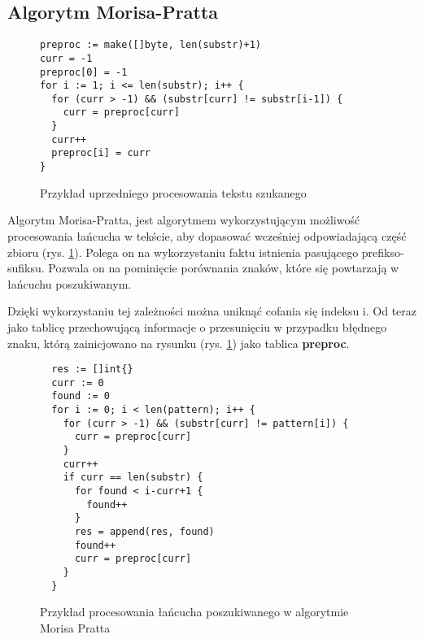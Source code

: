 
\subsection{Algorytm Morisa-Pratta}

\begin{figure}[htbp]
  \centering
  \begin{lstlisting}
preproc := make([]byte, len(substr)+1)
curr = -1
preproc[0] = -1
for i := 1; i <= len(substr); i++ {
  for (curr > -1) && (substr[curr] != substr[i-1]) {
    curr = preproc[curr]
  }
  curr++
  preproc[i] = curr
}
  \end{lstlisting}
  \caption{Przykład uprzedniego procesowania tekstu szukanego}
  \label{fig:code:preprocessMorisPratt}
\end{figure}

Algorytm Morisa-Pratta, jest algorytmem wykorzystującym możliwość procesowania 
łańcucha w tekście, aby dopasować wcześniej odpowiadającą część zbioru
(rys. \ref{fig:code:preprocessMorisPratt}). Polega on na wykorzystaniu faktu
 istnienia pasującego prefikso-sufiksu. Pozwala on na pominięcie porównania
 znaków, które się powtarzają w łańcuchu poszukiwanym.

Dzięki wykorzystaniu tej zależności można uniknąć cofania się indeksu i. 
Od teraz jako tablicę przechowującą informacje o przesunięciu w przypadku 
błędnego znaku, którą zainicjowano na rysunku (rys. \ref{fig:code:preprocessMorisPratt})
jako tablica \textbf{preproc}.

\begin{figure}[htbp]
    \centering
    \begin{lstlisting}
  res := []int{}
  curr := 0
  found := 0
  for i := 0; i < len(pattern); i++ {
    for (curr > -1) && (substr[curr] != pattern[i]) {
      curr = preproc[curr]
    }
    curr++
    if curr == len(substr) {
      for found < i-curr+1 {
        found++
      }
      res = append(res, found)
      found++
      curr = preproc[curr]
    }
  }
    \end{lstlisting}
    \caption{Przykład procesowania łańcucha poszukiwanego w algorytmie Morisa Pratta}
    \label{fig:code:algoMorisPratt}
  \end{figure}

